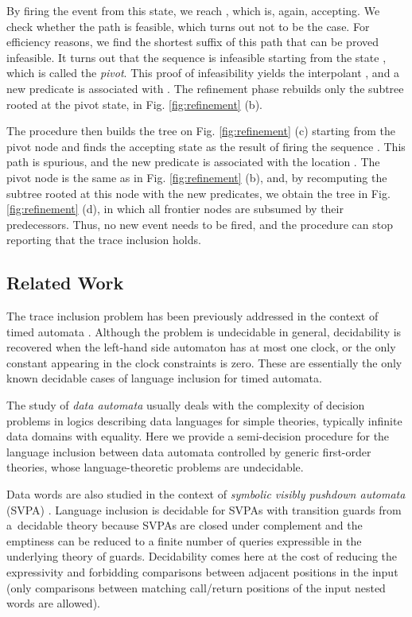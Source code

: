 \documentclass{llncs}
\begin{document}
By firing the event  from this state, we reach
, which is, again, accepting. We
check whether the path  is
feasible, which turns out not to be the case. For efficiency reasons,
we find the shortest suffix of this path that can be proved
infeasible. It turns out that the sequence 
is infeasible starting from the state , which is called the \emph{pivot}. This proof of
infeasibility yields the interpolant , and a new
predicate  is associated with . The refinement phase rebuilds only the subtree rooted
at the pivot state, in Fig.  \ref{fig:refinement} (b).

The procedure then builds the tree on Fig. \ref{fig:refinement} (c)
starting from the pivot node and finds the accepting state
 as the result of firing
the sequence . This path is
spurious, and the new predicate  is associated with the location
. The pivot node is the same as in
Fig. \ref{fig:refinement} (b), and, by recomputing the subtree rooted
at this node with the new predicates, we obtain the tree in
Fig. \ref{fig:refinement} (d), in which all frontier nodes are
subsumed by their predecessors. Thus, no new event needs to be fired,
and the procedure can stop reporting that the trace inclusion holds.

\subsection{Related Work}


The trace inclusion problem has been previously addressed in the
context of timed automata \cite{ouaknine-worrell-lics04}. Although the
problem is undecidable in general, decidability is recovered when the
left-hand side automaton has at most one clock, or the only constant
appearing in the clock constraints is zero. These are essentially the
only known decidable cases of language inclusion for timed automata.

The study of \emph{data automata}
\cite{Bojanczyk:2011:TLD,habermehl-data} usually deals with the
complexity of decision problems in logics describing data languages
for simple theories, typically infinite data domains with equality.
Here we provide a semi-decision procedure for the language inclusion
between data automata controlled by generic first-order theories,
whose language-theoretic problems are undecidable.

Data words are also studied in the context of \emph{symbolic visibly pushdown
automata} (SVPA) \cite{symbVisPushDown:CAV14}. Language inclusion is decidable
for SVPAs with transition guards from a~decidable theory because SVPAs are
closed under complement and the emptiness can be reduced to a finite number of
queries expressible in the underlying theory of guards. Decidability comes here
at the cost of reducing the expressivity and forbidding comparisons between
adjacent positions in the input (only comparisons between matching call/return
positions of the input nested words are allowed).
\end{document}
